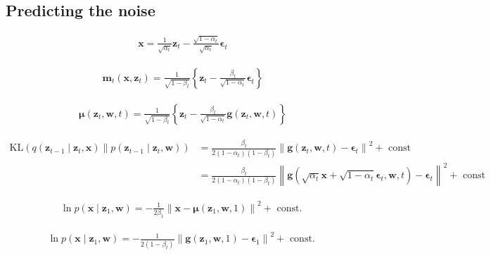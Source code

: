 \documentclass{article}
\begin{document}
\subsection{Predicting the noise}

\begin{align*}
\mathbf{x}=\frac{1}{\sqrt{\alpha_{t}}} \mathbf{z}_{t}-\frac{\sqrt{1-\alpha_{t}}}{\sqrt{\alpha_{t}}} \boldsymbol{\epsilon}_{t} 
\tag{20.34}
\end{align*}

\begin{align*}
\mathbf{m}_{t}\left(\mathbf{x}, \mathbf{z}_{t}\right)=\frac{1}{\sqrt{1-\beta_{t}}}\left\{\mathbf{z}_{t}-\frac{\beta_{t}}{\sqrt{1-\alpha_{t}}} \boldsymbol{\epsilon}_{t}\right\} 
\tag{20.35}
\end{align*}

\begin{align*}
\boldsymbol{\mu}\left(\mathbf{z}_{t}, \mathbf{w}, t\right)=\frac{1}{\sqrt{1-\beta_{t}}}\left\{\mathbf{z}_{t}-\frac{\beta_{t}}{\sqrt{1-\alpha_{t}}} \mathbf{g}\left(\mathbf{z}_{t}, \mathbf{w}, t\right)\right\} 
\tag{20.36}
\end{align*}

\begin{align*}
\mathrm{KL}\left(q\left(\mathbf{z}_{t-1} \mid \mathbf{z}_{t}, \mathbf{x}\right) \| p\left(\mathbf{z}_{t-1} \mid \mathbf{z}_{t}, \mathbf{w}\right) \right) 
& =\frac{\beta_{t}}{2\left(1-\alpha_{t}\right)\left(1-\beta_{t}\right)}\left\|\mathbf{g}\left(\mathbf{z}_{t}, \mathbf{w}, t\right)-\boldsymbol{\epsilon}_{t}\right\|^{2}+\text{ const } \\
& =\frac{\beta_{t}}{2\left(1-\alpha_{t}\right)\left(1-\beta_{t}\right)}\left\|\mathbf{g}\left(\sqrt{\alpha_{t}} \mathbf{x}+\sqrt{1-\alpha_{t}} \boldsymbol{\epsilon}_{t}, \mathbf{w}, t\right)-\boldsymbol{\epsilon}_{t}\right\|^{2}+\text{ const }
\tag{20.37}
\end{align*}

\begin{align*}
\ln p\left(\mathbf{x} \mid \mathbf{z}_{1}, \mathbf{w}\right)=-\frac{1}{2 \beta_{1}}\left\|\mathbf{x}-\boldsymbol{\mu}\left(\mathbf{z}_{1}, \mathbf{w}, 1\right)\right\|^{2}+\text{ const. } 
\tag{20.38}
\end{align*}

\begin{align*}
\ln p\left(\mathbf{x} \mid \mathbf{z}_{1}, \mathbf{w}\right)=-\frac{1}{2\left(1-\beta_{t}\right)}\left\|\mathbf{g}\left(\mathbf{z}_{1}, \mathbf{w}, 1\right)-\boldsymbol{\epsilon}_{1}\right\|^{2}+\text{ const. } 
\tag{20.39}
\end{align*}
\end{document}
